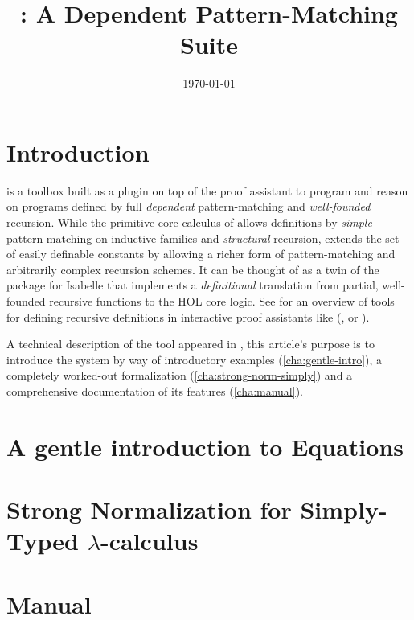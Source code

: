 \documentclass{report}
\author{\myname}
\date{\today}
\title{\Equations: A Dependent Pattern-Matching Suite}
\makeatletter
\renewcommand{\tableofcontents}{\noindent\@starttoc{toc}}
\makeatother
\begin{document}
\maketitle

\def\coqlibrary#1#2#3{}

\def\Equations{\texorpdfstring{\name{Equations}}{Equations}}

\chapter*{Introduction}
\label{cha:introduction}

\Equations is a toolbox built as a plugin on top of the \Coq proof assistant
to program and reason on programs defined by full \emph{dependent}
pattern-matching and \emph{well-founded} recursion. While the primitive
core calculus of \Coq allows definitions by \emph{simple} pattern-matching on
inductive families and \emph{structural} recursion, \Equations extends
the set of easily definable constants by allowing a richer form of
pattern-matching and arbitrarily complex recursion schemes. It can be
thought of as a twin of the  package for Isabelle that
implements a \emph{definitional} translation from partial, well-founded
recursive functions to the HOL core logic. See
\cite{BoveKraussSozeau2011} for an overview of tools for defining
recursive definitions in interactive proof assistants like (\Coq, \Agda
or \Isabelle).

A technical description of the tool appeared in
\cite{sozeau.Coq/Equations/ITP10}, this article's purpose is to
introduce the system by way of introductory examples
(\autoref{cha:gentle-intro}), a completely worked-out formalization
(\autoref{cha:strong-norm-simply}) and a comprehensive documentation of
its features (\autoref{cha:manual}).

\doparttoc
\parttoc
\tableofcontents

\chapter{A gentle introduction to Equations}
\label{cha:gentle-intro}


\chapter{Strong Normalization for Simply-Typed \texorpdfstring{$\lambda$}{Lambda}-calculus}
\label{cha:strong-norm-simply}


\chapter{Manual}
\label{cha:manual}




\label{cha:bibliography}

\end{document}

